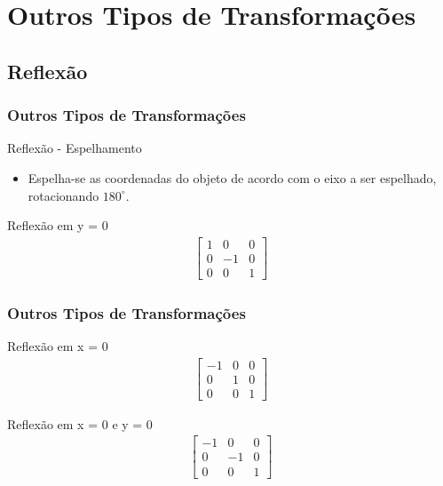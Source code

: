 \documentclass{beamer}
\begin{document}
\section{Outros Tipos de Transformações}
\subsection{Reflexão}
\begin{frame}
\frametitle{Outros Tipos de Transformações}
	\begin{block}{Reflexão - Espelhamento}
		\begin{itemize}
			\item Espelha-se as coordenadas do objeto de acordo com o eixo a ser espelhado, rotacionando $180^{\circ}$.
		\end{itemize}
	\end{block}
	
	\begin{block}{Reflexão em y = 0}
		\begin{eqnarray*}
			\begin{bmatrix}
				1 & 0 & 0 \\
				0 & -1 & 0 \\
				0 & 0 & 1 
			\end{bmatrix}
		\end{eqnarray*}
	\end{block}	
	
\end{frame}	

\begin{frame}
\frametitle{Outros Tipos de Transformações}

	\begin{block}{Reflexão em x = 0}
		\begin{eqnarray*}
			\begin{bmatrix}
				-1 & 0 & 0 \\
				0 & 1 & 0 \\
				0 & 0 & 1 
			\end{bmatrix}
		\end{eqnarray*}
	\end{block}	
	
	\begin{block}{Reflexão em x = 0 e y = 0}
		\begin{eqnarray*}
			\begin{bmatrix}
				-1 & 0 & 0 \\
				0 & -1 & 0 \\
				0 & 0 & 1 
			\end{bmatrix}
		\end{eqnarray*}
	\end{block}	
	
\end{frame}
\end{document}
